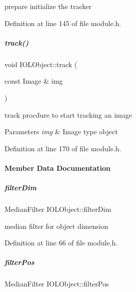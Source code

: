prepare initialize the tracker 



Definition at line 145 of file module.\+h.

\mbox{\label{group__iol2opc_ab113f55006c7a92a7b919d59ac6b94df}} 
\subparagraph{\texorpdfstring{track()}{track()}}
{\footnotesize\ttfamily void I\+O\+L\+Object\+::track (\begin{DoxyParamCaption}\item[{const Image \&}]{img }\end{DoxyParamCaption})\hspace{0.3cm}{\ttfamily [inline]}}



track procdure to start tracking an image 


\begin{DoxyParams}{Parameters}
{\em img} & Image type object \\
\hline
\end{DoxyParams}


Definition at line 170 of file module.\+h.



\paragraph{Member Data Documentation}
\mbox{\label{group__iol2opc_a6c5b58b7df86ea40ed804ba9fcb4bb12}} 
\subparagraph{\texorpdfstring{filter\+Dim}{filterDim}}
{\footnotesize\ttfamily Median\+Filter I\+O\+L\+Object\+::filter\+Dim\hspace{0.3cm}{\ttfamily [protected]}}



median filter for object dimension 



Definition at line 66 of file module.\+h.

\mbox{\label{group__iol2opc_a93bdd7472a32538399030d0366a3f5d0}} 
\subparagraph{\texorpdfstring{filter\+Pos}{filterPos}}
{\footnotesize\ttfamily Median\+Filter I\+O\+L\+Object\+::filter\+Pos\hspace{0.3cm}{\ttfamily [protected]}}



